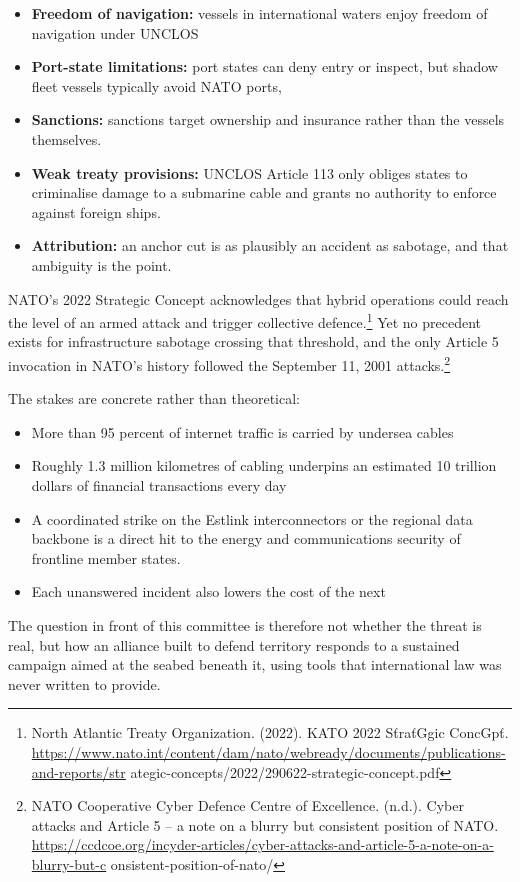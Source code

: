 \begin{itemize}
  \item \textbf{Freedom of navigation:} vessels in international waters enjoy freedom of navigation under UNCLOS
  \item \textbf{Port-state limitations:} port states can deny entry or inspect, but shadow fleet vessels typically avoid NATO ports,
  \item \textbf{Sanctions:} sanctions target ownership and insurance rather than the vessels themselves.
  \item \textbf{Weak treaty provisions:} UNCLOS Article 113 only obliges states to criminalise damage to a submarine cable and grants no authority to enforce against foreign ships.
  \item \textbf{Attribution:} an anchor cut is as plausibly an accident as sabotage, and that ambiguity is the point.
\end{itemize}

NATO's 2022 Strategic Concept acknowledges that hybrid operations could reach the level of an armed attack and trigger collective defence.\footnote{North Atlantic Treaty Organization. (2022). KATO 2022 SťraťGgic ConcGpť. \url{https://www.nato.int/content/dam/nato/webready/documents/publications-and-reports/str} ategic-concepts/2022/290622-strategic-concept.pdf} Yet no precedent exists for infrastructure sabotage crossing that threshold, and the only Article 5 invocation in NATO's history followed the September 11, 2001 attacks.\footnote{NATO Cooperative Cyber Defence Centre of Excellence. (n.d.). Cyber attacks and Article 5 – a note on a blurry but consistent position of NATO. \url{https://ccdcoe.org/incyder-articles/cyber-attacks-and-article-5-a-note-on-a-blurry-but-c} onsistent-position-of-nato/}

The stakes are concrete rather than theoretical:

\begin{itemize}
  \item More than 95 percent of internet traffic is carried by undersea cables
  \item Roughly 1.3 million kilometres of cabling underpins an estimated 10 trillion dollars of financial transactions every day
  \item A coordinated strike on the Estlink interconnectors or the regional data backbone is a direct hit to the energy and communications security of frontline member states.
  \item Each unanswered incident also lowers the cost of the next
\end{itemize}

The question in front of this committee is therefore not whether the threat is real, but how an alliance built to defend territory responds to a sustained campaign aimed at the seabed beneath it, using tools that international law was never written to provide.
